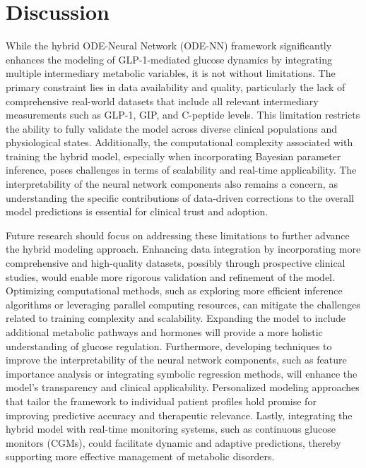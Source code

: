 \documentclass[9pt,shortpaper,twoside,web]{ieeecolor}
\begin{document}
\section{Discussion}
\label{sec:discussion}

While the hybrid ODE-Neural Network (ODE-NN) framework significantly enhances the modeling of GLP-1-mediated glucose dynamics by integrating multiple intermediary metabolic variables, it is not without limitations. The primary constraint lies in data availability and quality, particularly the lack of comprehensive real-world datasets that include all relevant intermediary measurements such as GLP-1, GIP, and C-peptide levels. This limitation restricts the ability to fully validate the model across diverse clinical populations and physiological states. Additionally, the computational complexity associated with training the hybrid model, especially when incorporating Bayesian parameter inference, poses challenges in terms of scalability and real-time applicability. The interpretability of the neural network components also remains a concern, as understanding the specific contributions of data-driven corrections to the overall model predictions is essential for clinical trust and adoption.

Future research should focus on addressing these limitations to further advance the hybrid modeling approach. Enhancing data integration by incorporating more comprehensive and high-quality datasets, possibly through prospective clinical studies, would enable more rigorous validation and refinement of the model. Optimizing computational methods, such as exploring more efficient inference algorithms or leveraging parallel computing resources, can mitigate the challenges related to training complexity and scalability. Expanding the model to include additional metabolic pathways and hormones will provide a more holistic understanding of glucose regulation. Furthermore, developing techniques to improve the interpretability of the neural network components, such as feature importance analysis or integrating symbolic regression methods, will enhance the model's transparency and clinical applicability. Personalized modeling approaches that tailor the framework to individual patient profiles hold promise for improving predictive accuracy and therapeutic relevance. Lastly, integrating the hybrid model with real-time monitoring systems, such as continuous glucose monitors (CGMs), could facilitate dynamic and adaptive predictions, thereby supporting more effective management of metabolic disorders.
\end{document}
